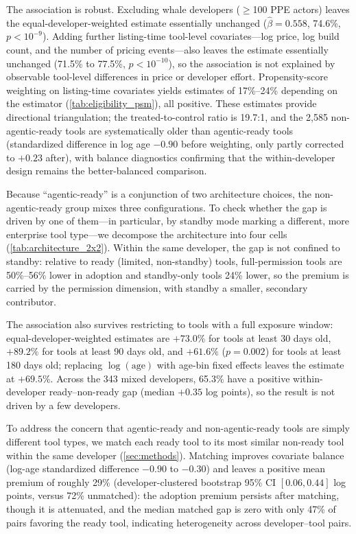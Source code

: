 The association is robust. Excluding whale developers ($\geq$100 PPE actors) leaves
the equal-developer-weighted estimate essentially unchanged ($\hat\beta = 0.558$,
74.6\%, $p < 10^{-9}$). Adding further listing-time tool-level covariates---log
price, log build count, and the number of pricing events---also leaves the
estimate essentially unchanged (71.5\% to 77.5\%, $p < 10^{-10}$), so the
association is not explained by observable tool-level differences in price or
developer effort. Propensity-score weighting on listing-time covariates
yields estimates of 17\%--24\% depending on the estimator
(\autoref{tab:eligibility_psm}), all positive. These estimates provide directional
triangulation; the
treated-to-control ratio is 19.7:1, and the 2{,}585 non-agentic-ready tools are
systematically older than agentic-ready tools (standardized difference in log
age $-0.90$ before weighting, only partly corrected to $+0.23$ after), with balance diagnostics confirming that the within-developer design remains the better-balanced comparison.

Because ``agentic-ready'' is a conjunction of two architecture choices, the
non-agentic-ready group mixes three configurations. To check whether the gap is
driven by one of them---in particular, by standby mode marking a different,
more enterprise tool type---we decompose the architecture into four cells
(\autoref{tab:architecture_2x2}). Within the same developer, the gap is not
confined to standby: relative to ready (limited, non-standby) tools,
full-permission tools are 50\%--56\% lower in adoption and standby-only tools
24\% lower, so the premium is carried by the permission dimension, with standby
a smaller, secondary contributor.



The association also survives restricting to tools with a full exposure window:
equal-developer-weighted estimates are $+73.0\%$ for tools at least 30 days old,
$+89.2\%$ for tools at least 90 days old, and $+61.6\%$ ($p = 0.002$) for tools
at least 180 days old; replacing $\log(\text{age})$
with age-bin fixed effects leaves the estimate at $+69.5\%$. Across the 343
mixed developers, 65.3\% have a positive within-developer ready--non-ready gap
(median $+0.35$ log points), so the result is not driven by a few developers.

To address the concern that agentic-ready and non-agentic-ready tools are simply
different tool types, we match each ready tool to its most similar non-ready
tool within the same developer (\autoref{sec:methods}). Matching improves
covariate balance (log-age standardized difference $-0.90$ to $-0.30$) and
leaves a positive mean premium of roughly 29\% (developer-clustered bootstrap
95\% CI $[0.06, 0.44]$
log points, versus 72\% unmatched): the adoption premium persists after matching,
though it is attenuated, and the median matched gap is zero with
only 47\% of pairs favoring the ready tool, indicating heterogeneity across
developer--tool pairs.

